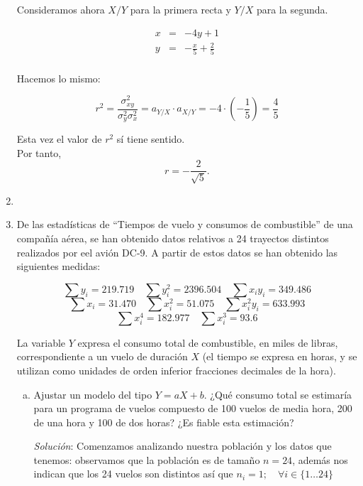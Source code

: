\documentclass[10pt,a4paper]{article}
\begin{document}
\begin{enumerate}
Consideramos ahora $X/Y$ para la primera recta y $Y/X$ para la segunda.

\[
\begin{array}{lll}
x & = & -4y + 1\\
y & = & -\frac{x}{5} + \frac{2}{5}\\
\end{array}
\]

Hacemos lo mismo:

$$r^2 = \frac{\sigma^2_{xy}}{\sigma^2_y \sigma^2_x} = a_{Y/X} \cdot a_{X/Y} = -4 \cdot \left( -\frac{1}{5}  \right) = \frac{4}{5}$$

Esta vez el valor de $r^2$ sí tiene sentido.
\\Por tanto, $$r = -\frac{2}{\sqrt{5}}.$$
\newpage

\item
\newpage


        \item De las estadísticas de ``Tiempos de vuelo y consumos de combustible'' de una compañía aérea, se han obtenido datos relativos a 24 trayectos distintos realizados por eel avión DC-9. A partir de estos datos se han obtenido las siguientes medidas:
            \begin{center}
                \[
                \sum y_i = 219.719 \quad  \sum y_i^2 = 2396.504 \quad \sum x_i y_i = 349.486
                \]
                \[
                \sum x_i = 31.470 \quad \sum x_i^2 = 51.075 \quad \sum x_i^2 y_i = 633.993
                \]
                \[
                \sum x_i^4 = 182.977 \quad \sum x_i^3 = 93.6
                \]
            \end{center}
            La variable \(Y\) expresa el consumo total de combustible, en miles de libras, correspondiente a un vuelo de duración \(X\) (el tiempo se expresa en horas, y se utilizan como unidades de orden inferior fracciones decimales de la hora).

            \begin{enumerate}[a)]
                \item Ajustar un modelo del tipo \(Y=aX+b\). ¿Qué consumo total se estimaría para un programa de vuelos compuesto de 100 vuelos de media hora, 200 de una hora y 100 de dos horas? ¿Es fiable esta estimación?


                    \emph{Solución}: Comenzamos analizando nuestra población y los datos que tenemos: observamos que la población es de tamaño \(n=24\), además nos indican que los 24 vuelos son distintos así que \(n_i = 1; \quad \forall i \in \{1 \dots 24\}\) 



\end{enumerate}
\end{enumerate}
\end{document}
